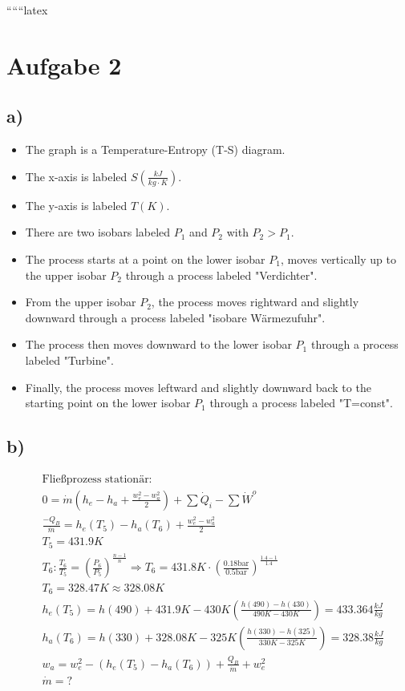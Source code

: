
``````latex


\section*{Aufgabe 2}

\subsection*{a)}

\begin{itemize}
    \item The graph is a Temperature-Entropy (T-S) diagram.
    \item The x-axis is labeled \( S \left( \frac{kJ}{kg \cdot K} \right) \).
    \item The y-axis is labeled \( T(K) \).
    \item There are two isobars labeled \( P_1 \) and \( P_2 \) with \( P_2 > P_1 \).
    \item The process starts at a point on the lower isobar \( P_1 \), moves vertically up to the upper isobar \( P_2 \) through a process labeled "Verdichter".
    \item From the upper isobar \( P_2 \), the process moves rightward and slightly downward through a process labeled "isobare Wärmezufuhr".
    \item The process then moves downward to the lower isobar \( P_1 \) through a process labeled "Turbine".
    \item Finally, the process moves leftward and slightly downward back to the starting point on the lower isobar \( P_1 \) through a process labeled "T=const".
\end{itemize}

\subsection*{b)}

\begin{align*}
    &\text{Fließprozess stationär:} \\
    &0 = \dot{m} \left( h_e - h_a + \frac{w_{e}^2 - w_{a}^2}{2} \right) + \sum \dot{Q}_i - \sum \dot{W}^o \\
    &\frac{-Q_B}{\dot{m}} = h_e(T_5) - h_a(T_6) + \frac{w_{e}^2 - w_{a}^2}{2} \\
    &T_5 = 431.9K \\
    &T_6: \frac{T_6}{T_5} = \left( \frac{P_6}{P_5} \right)^{\frac{n-1}{n}} \Rightarrow T_6 = 431.8K \cdot \left( \frac{0.18 \text{bar}}{0.5 \text{bar}} \right)^{\frac{1.4-1}{1.4}} \\
    &T_6 = 328.47K \approx 328.08K \\
    &h_e(T_5) = h(490) + 431.9K - 430K \left( \frac{h(490) - h(430)}{490K - 430K} \right) = 433.364 \frac{kJ}{kg} \\
    &h_a(T_6) = h(330) + 328.08K - 325K \left( \frac{h(330) - h(325)}{330K - 325K} \right) = 328.38 \frac{kJ}{kg} \\
    &w_a = w_e^2 - \left( h_e(T_5) - h_a(T_6) \right) + \frac{Q_B}{\dot{m}} + w_e^2 \\
    &\dot{m} = ?
\end{align*}

